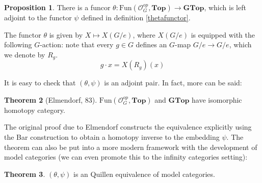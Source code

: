 \documentclass{article}
\theoremstyle{definition}
\newtheorem{theorem}{Theorem}[section] %
\newtheorem{proposition}[theorem]{Proposition}
\begin{document}
\begin{tcolorbox}[colback=blue!5!white,colframe=blue!30!white]
    \begin{proposition}
    There is a funcor $\theta: \textrm{Fun}(\mathcal{O}_G^{op},\textbf{Top})\to \textbf{GTop}$, which is left adjoint to the functor $\psi$ defined in definition \ref{thetafunctor}.
    \end{proposition}
    \end{tcolorbox}
    The functor $\theta$ is given by $X\mapsto X(G/e)$, where $X(G/e)$ is equipped with the following $G$-action: note that every $g\in G$ defines an $G$-map $G/e\to G/e$, which we denote by $R_g$.\[g\cdot x=X(R_g)(x)\] 

    It is easy to check that $(\theta,\psi)$ is an adjoint pair. In fact, more can be said:
    
    \begin{tcolorbox}[colback=red!5!white,colframe=red!30!white]
        \begin{theorem}[Elmendorf, 83]
         $\textrm{Fun}(\mathcal{O}_G^{op},\textbf{Top})$ and $\textbf{GTop}$ have isomorphic homotopy category. 
        \end{theorem}
        \end{tcolorbox}
    The original proof due to Elmendorf constructs the equivalence explicitly using the Bar construction to obtain a homotopy inverse to the embedding $\psi$. The theorem can also be put into a more modern framework with the development of model categories (we can even promote this to the infinity categories setting):

    \begin{tcolorbox}[colback=red!5!white,colframe=red!30!white]
    \begin{theorem}
    $(\theta,\psi)$ is an Quillen equivalence of model categories.
    \end{theorem}
    \end{tcolorbox}
\end{document}
